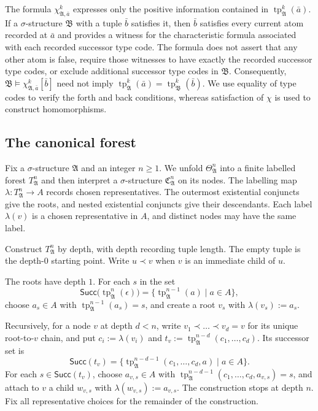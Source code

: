 \documentclass{lmcs}
\newcommand{\tp}{\operatorname{tp}}
\newcommand{\A}{\mathfrak{A}}
\newcommand{\B}{\mathfrak{B}}
\newcommand{\C}{\mathfrak{C}}
\begin{document}
\begin{rem}\label{rem:positive-characteristic-information}
The formula $\chi_{\A,\bar a}^{k}$ expresses only the positive information
contained in $\tp_{\A}^{k}(\bar a)$.  If a $\sigma$-structure $\B$ with a
tuple $\bar b$ satisfies it, then $\bar b$ satisfies every current atom
recorded at $\bar a$ and provides a witness for the characteristic formula
associated with each recorded successor type code.  The formula does not assert
that any other atom is false, require those witnesses to have exactly the
recorded successor type codes, or exclude additional successor type codes in $\B$.
Consequently,
$\B\models\chi_{\A,\bar a}^{k}[\bar b]$ need not imply
$\tp_{\A}^{k}(\bar a)=\tp_{\B}^{k}(\bar b)$.  We use equality of type
codes to verify the forth and back conditions, whereas satisfaction of $\chi$
is used to construct homomorphisms.
\end{rem}


\subsection{The canonical forest}\label{sec:canonical}

Fix a $\sigma$-structure $\A$ and an integer $n\geq1$.  We unfold
$\Theta_{\A}^{n}$ into a finite labelled forest $T_{\A}^{n}$ and then
interpret a $\sigma$-structure $\C_{\A}^{n}$ on its nodes.  The labelling map
$\lambda:T_{\A}^{n}\longrightarrow A$ records chosen representatives.  The outermost
existential conjuncts give the roots, and nested existential conjuncts give
their descendants.  Each label $\lambda(v)$ is a chosen representative in
$A$, and distinct nodes may have the same label.

Construct $T_{\A}^{n}$ by depth, with depth recording tuple length.  The empty
tuple is the depth-$0$ starting point.  Write $u\prec v$ when $v$ is an
immediate child of $u$.

The roots have depth $1$.  For each $s$ in the set
\[
  \mathsf{Succ}\bigl(\tp_{\A}^{n}(\epsilon)\bigr)
  =\bigl\{\tp_{\A}^{n-1}(a)\mid a\in A\bigr\},
\]
choose $a_s\in A$ with $\tp_{\A}^{n-1}(a_s)=s$, and create a root $v_s$
with $\lambda(v_s):=a_s$.

Recursively, for a node $v$ at depth $d<n$, write
$v_1\prec\ldots\prec v_d=v$ for its unique root-to-$v$ chain, and put
$c_i:=\lambda(v_i)$ and $t_v:=\tp_{\A}^{n-d}(c_1,\ldots,c_d)$.  Its successor
set is
\[
  \mathsf{Succ}(t_v)
  =
  \bigl\{
    \tp_{\A}^{n-d-1}(c_1,\ldots,c_d,a)
    \mid a\in A
  \bigr\}.
\]
For each $s\in\mathsf{Succ}(t_v)$, choose $a_{v,s}\in A$ with
$\tp_{\A}^{n-d-1}(c_1,\ldots,c_d,a_{v,s})=s$, and attach to $v$ a child
$w_{v,s}$ with $\lambda(w_{v,s}):=a_{v,s}$.  The construction stops at depth
$n$.  Fix all representative choices for the remainder of the construction.
\end{document}
